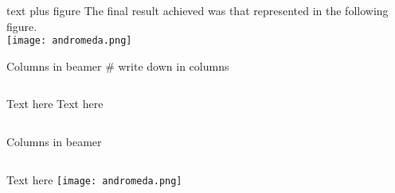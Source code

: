 \begin{frame}{text plus figure}
    \centering
    The final result achieved was that represented in the following figure.\\
    \bigskip
    \texttt{[image: andromeda.png]}
\end{frame}

\begin{frame}{Columns in beamer} # write down in columns
    \begin{columns}
        \centering
        Text here
        \centering
        Text here
    \end{columns}
\end{frame}

\begin{frame}{Columns in beamer}
    \begin{columns}
        \centering
        Text here
        \centering
        \texttt{[image: andromeda.png]}
    \end{columns}
\end{frame}



 
